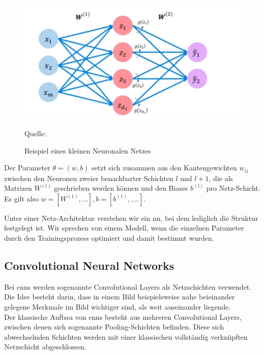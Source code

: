 \documentclass[twoside, 12pt,a4paper]{book}
\newcommand{\source}[1]{\caption*{\hfill Quelle: {#1}} }
\numberwithin{equation}{section}
\begin{document}
	
	\begin{figure}[ht]
		\centering
		\includegraphics[width=0.5\textheight]{single_layer_nn.png}
	
		\caption{Beispiel eines kleinen Neuronalen Netzes}
		
		\label{im:single_layer_neuralnet}
		\source{\cite{introtodeeplearning}}
	\end{figure}

	\noindent Der Parameter $\theta = (w,b)$ setzt sich zusammen aus den Kantengewichten $w_{ij}$ zwischen den Neuronen zweier benachbarter Schichten $l$ und $l+1$, die als Matrizen $W^{(l)}$ geschrieben werden können und den Biases $b^{(l)}$ pro Netz-Schicht. Es gilt also $w = [W^{(1)}, ...], b = [b^{(1)}, ....]$.

	
	\noindent Unter einer Netz-Architektur verstehen wir ein \ac{nn}, bei dem lediglich die Struktur festgelegt ist. Wir sprechen von einem Modell, wenn die einzelnen Parameter durch den Trainingsprozess optimiert und damit bestimmt wurden.
	
	
	
	
	

	
	\subsection{Convolutional Neural Networks}
	\noindent Bei \acfp{cnn} werden sogenannte Convolutional Layers als Netzschichten verwendet. Die Idee besteht darin, dass in einem Bild beispielsweise nahe beieinander gelegene Merkmale im Bild wichtiger sind, als weit auseinander liegende. \\
	
	\noindent Der klassische Aufbau von \acp{cnn} besteht aus mehreren Convolutional Layers, zwischen denen sich sogenannte Pooling-Schichten befinden. Diese sich abwechselnden Schichten werden mit einer klassischen vollständig verknüpften Netzschicht abgeschlossen.\\
	
\end{document}

